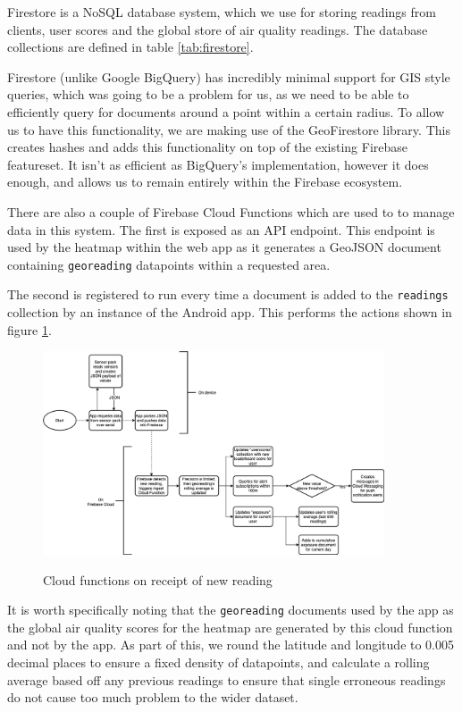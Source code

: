 \documentclass[sigconf, nonacm]{acmart}
\begin{document}
Firestore is a NoSQL database system, which we use for storing readings from clients, user
scores and the global store of air quality readings. The database collections are defined in
table \ref{tab:firestore}.

Firestore (unlike Google BigQuery) has incredibly minimal support for GIS style queries, which
was going to be a problem for us, as we need to be able to efficiently query for documents
around a point within a certain radius. To allow us to have this functionality, we are making
use of the GeoFirestore library. This creates hashes and adds this functionality on top of the
existing Firebase featureset. It isn't as efficient as BigQuery's implementation, however it does
enough, and allows us to remain entirely within the Firebase ecosystem.

There are also a couple of Firebase Cloud Functions\cite{firebase_functions} which are used to to manage data in this
system. The first is exposed as an API endpoint. This endpoint is used by the heatmap within
the web app as it generates a GeoJSON document containing \texttt{georeading} datapoints within
a requested area.

The second is registered to run every time a document is added to the \texttt{readings} collection
by an instance of the Android app. This performs the actions shown in figure \ref{fig:cloudfunctions}.

\begin{figure}[h]
	\includegraphics[width=0.9\textwidth]{cloudfunctions}
	\label{fig:cloudfunctions}
	\caption{Cloud functions on receipt of new reading}
\end{figure}

It is worth specifically noting that the \texttt{georeading} documents used by the app as the 
global air quality scores for the heatmap are generated by this cloud function and not by the
app. As part of this, we round the latitude and longitude to 0.005 decimal places to ensure
a fixed density of datapoints, and calculate a rolling average based off any previous readings
to ensure that single erroneous readings do not cause too much problem to the wider dataset.
\end{document}
